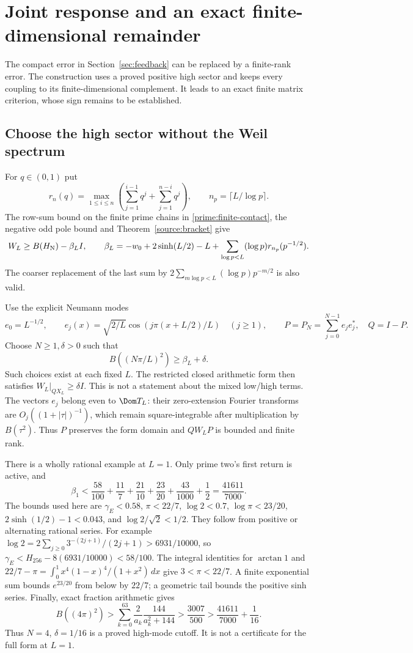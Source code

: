 \section{Joint response and an exact finite-dimensional remainder}
\label{sec:joint}
The compact error in Section~\ref{sec:feedback} can be replaced by a
finite-rank error. The construction uses a proved positive high
sector and keeps every coupling to its finite-dimensional
complement. It leads to an exact finite matrix criterion, whose
sign remains to be established.

\subsection{Choose the high sector without the Weil spectrum}
For $q\in(0,1)$ put
\[
r_n(q)=\max_{1\le i\le n}
 \left(\sum_{j=1}^{i-1}q^j+\sum_{j=1}^{n-i}q^j\right),\qquad
n_p=\lceil L/\log p\rceil.
\]
The row-sum bound on the finite prime chains in
\eqref{prime:finite-contact}, the negative odd pole bound and
Theorem~\ref{source:bracket} give
\begin{equation}\label{joint:beta}
W_L\ge B(H_{\rm N})-\beta_LI,\qquad
\beta_L=-w_0+2\sinh(L/2)-L+
 \sum_{\log p<L}(\log p)r_{n_p}(p^{-1/2}).
\end{equation}
The coarser replacement of the last sum by
$2\sum_{m\log p<L}(\log p)p^{-m/2}$ is also valid.

Use the explicit Neumann modes
\[
e_0=L^{-1/2},\qquad
e_j(x)=\sqrt{2/L}\cos(j\pi(x+L/2)/L)\quad(j\ge1),
\qquad P=P_N=\sum_{j=0}^{N-1}e_je_j^*,\quad Q=I-P.
\]
Choose $N\ge1,\delta>0$ such that
\begin{equation}\label{joint:cutoff}
B((N\pi/L)^2)\ge\beta_L+\delta.
\end{equation}
Such choices exist at each fixed $L$. The restricted closed
arithmetic form then satisfies $W_L|_{QX_L}\ge\delta I$.
This is not a statement about the mixed low/high terms.
The vectors $e_j$ belong even to $\Dom T_L$: their zero-extension
Fourier transforms are $O_j((1+|\tau|)^{-1})$, which remain
square-integrable after multiplication by $B(\tau^2)$.
Thus $P$ preserves the form domain and $QW_LP$ is bounded and
finite rank.

There is a wholly rational example at $L=1$. Only prime two's
first return is active, and
\[
\beta_1<
\frac{58}{100}+\frac{11}{7}+\frac{21}{10}+\frac{23}{20}
       +\frac{43}{1000}+\frac12
=\frac{41611}{7000}.
\]
The bounds used here are
$\gamma_{\!E}<0.58$, $\pi<22/7$, $\log2<0.7$,
$\log\pi<23/20$, $2\sinh(1/2)-1<0.043$, and
$\log2/\sqrt2<1/2$. They follow from positive or alternating
rational series. For example
$\log2=2\sum_{j\ge0}3^{-(2j+1)}/(2j+1)>6931/10000$,
so $\gamma_{\!E}<H_{256}-8(6931/10000)<58/100$.
The integral identities for $\arctan1$ and
$22/7-\pi=\int_0^1x^4(1-x)^4/(1+x^2)\,dx$ give $3<\pi<22/7$.
A finite exponential sum bounds $e^{23/20}$ from below by $22/7$;
a geometric tail bounds the positive sinh series.
Finally, exact fraction arithmetic gives
\[
B((4\pi)^2)>
\sum_{k=0}^{63}\frac2{a_k}\frac{144}{a_k^2+144}
>\frac{3007}{500}>
\frac{41611}{7000}+\frac1{16}.
\]
Thus $N=4$, $\delta=1/16$ is a proved high-mode cutoff.
It is not a certificate for the full form at $L=1$.

